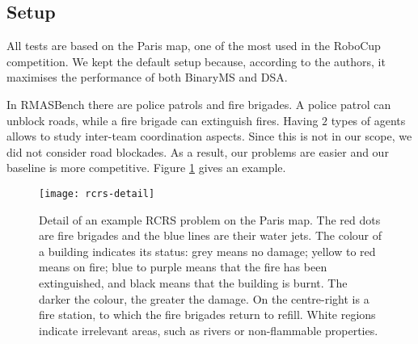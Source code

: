\subsection{Setup}\label{sec:robosetup}

All tests are based on the Paris map, one of the most used in the RoboCup competition. We
kept the default setup \cite[Section $6.1$]{pujol2015} because, according to the authors,
it maximises the performance of both BinaryMS and DSA.

In RMASBench there are police patrols and fire brigades. A police patrol can unblock
roads, while a fire brigade can extinguish fires. Having $2$ types of agents allows to
study inter-team coordination aspects. Since this is not in our scope, we did not consider
road blockades. As a result, our problems are easier and our baseline is more competitive.
Figure \ref{fig:rcrs} gives an example.

\begin{figure}[t]
    \centering
    \texttt{[image: rcrs-detail]}
    \caption[Detail of an example problem in the RCRS]{%
    Detail of an example RCRS problem on the Paris map. The red dots are fire brigades and
    the blue lines are their water jets. The colour of a building indicates its status:
    grey means no damage; yellow to red means on fire; blue to purple means that the fire
    has been extinguished, and black means that the building is burnt. The darker the
    colour, the greater the damage. On the centre-right is a fire station, to which the
    fire brigades return to refill. White regions indicate irrelevant areas, such as
    rivers or non-flammable properties.}
    \label{fig:rcrs}
\end{figure}

